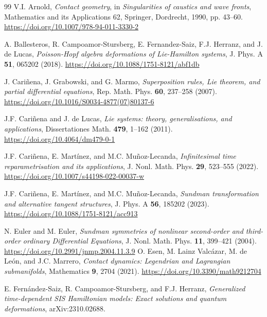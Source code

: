 \documentclass[12pt]{article}
\theoremstyle{plain}
\theoremstyle{definition}
\numberwithin{equation}{section}
\begin{document}
\begin{thebibliography}{99}
V.I. Arnold, {\it 
Contact geometry}, in {\sl Singularities of caustics and wave fronts}, Mathematics and its Applications  62, Springer, Dordrecht, 1990, pp. 43--60.
\url{https://doi.org/10.1007/978-94-011-3330-2}

A. Ballesteros, R. Campoamor-Stursberg, E. Fernandez-Saiz, F.J. Herranz, and J. de Lucas, {\it Poisson-Hopf algebra deformations of Lie-Hamilton systems}, J. Phys. A {\bf 51}, 065202 (2018). \url{https://doi.org/10.1088/1751-8121/abf1db}

J. Cari\~nena, J. Grabowski, and G. Marmo, {\it Superposition rules, Lie theorem, and partial differential equations}, Rep. Math. Phys. {\bf 60}, 237--258 (2007).  \url{https://doi.org/10.1016/S0034-4877(07)80137-6}

J.F. Cari\~nena and J. de Lucas, {\it Lie systems: theory, generalisations, and applications}, Dissertationes Math. {\bf 479}, 1--162  (2011). \url{https://doi.org/10.4064/dm479-0-1}

J.F. Cari\~nena, E. Mart\'inez, and M.C. Mu\~noz-Lecanda,
{\it Infinitesimal time reparametrisation and its applications}, J. Nonl. Math. Phys. {\bf 29}, 523--555 (2022).
\url{https://doi.org/10.1007/s44198-022-00037-w}

J.F. Cari\~nena, E. Mart\'inez, and M.C. Mu\~noz-Lecanda,
{\it Sundman transformation and alternative tangent
structures},  J. Phys. A {\bf 56}, 185202 (2023).
\url{https://doi.org/10.1088/1751-8121/acc913}



N. Euler and M. Euler,
{\it Sundman symmetries of nonlinear second-order and third-order ordinary Differential Equations},
J. Nonl. Math. Phys. {\bf  11}, 399–421 (2004).
\url{https://doi.org/10.2991/jnmp.2004.11.3.9}
O. Esen, M. Lainz Valc\'azar, M. de Le\'on, and J.C. Marrero, {\it 
Contact dynamics: Legendrian and Lagrangian submanifolds}, Mathematics {\bf 9}, 2704 (2021). \url{https://doi.org/10.3390/math9212704}

E. Fern\'andez-Saiz, R. Campoamor-Stursberg, and F.J. Herranz,
{\it Generalized time-dependent SIS Hamiltonian models:
Exact solutions and quantum deformations}, arXiv:2310.02688.


\end{thebibliography}
\end{document}
